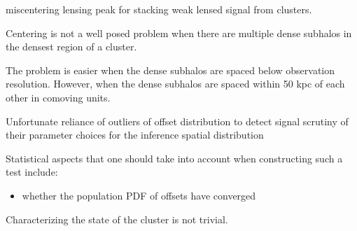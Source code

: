 \cite{Zitrin2012}
\cite{Zitrin2012a}
\cite{Mohammed2014}
miscentering lensing peak for stacking weak lensed signal from clusters.  

Centering is not a well posed problem when there are multiple dense subhalos in the densest
region of a cluster.

The problem is easier when the dense subhalos are spaced below observation resolution. 
However, when the dense subhalos are spaced within 50 kpc of each other in
comoving units.  

Unfortunate reliance of outliers of offset distribution to detect signal 
scrutiny of their parameter choices for the inference spatial distribution 

% 
% 
% 
% 
% 
% 
% 
% 
% 
% 
% 
% 
% 
Statistical aspects that one should take into account when constructing such a
test include: 
\begin{itemize}
\item whether the population PDF of offsets have converged  
\end{itemize}
% 
% 
Characterizing the state of the cluster is not trivial.
% 

